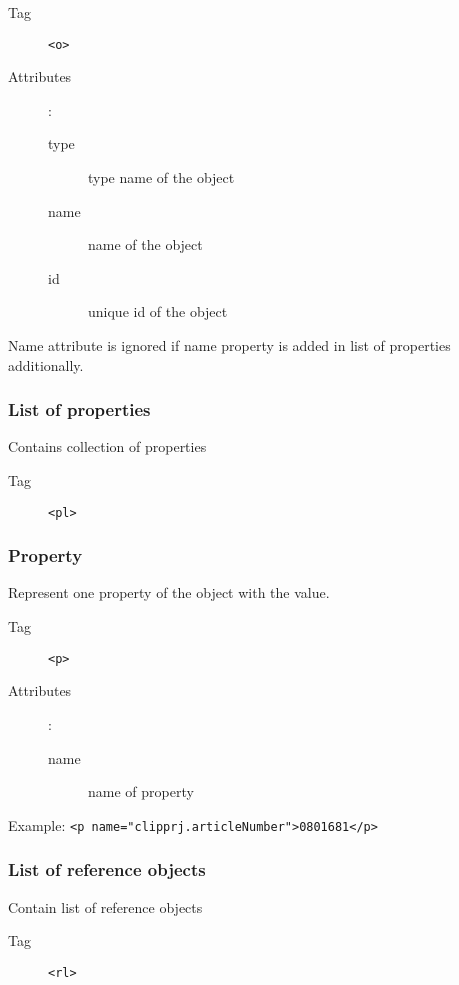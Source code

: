 \documentclass[%
	a4paper,
	oneside,
	listof=numbered,
	parskip=half,
	headsepline=true,
	footsepline=false,
	0.7headlines,
	]{scrbook}
\begin{document}
\begin{description}
	\item[Tag] \verb|<o>|
	\item[Attributes]:
	
	\begin{description}
		\item[type] type name of the object
		\item[name] name of the object
		\item[id] unique id of the object
	\end{description}
\end{description}

Name attribute is ignored if name property is added in list of properties additionally.

\subsubsection{List of properties}

Contains collection of properties

\begin{description}
	\item[Tag] \verb|<pl>|
\end{description}

\subsubsection{Property}

Represent one property of the object with the value.

\begin{description}
	\item[Tag] \verb|<p>|
	\item[Attributes]:
	
	\begin{description}
		\item[name] name of property
	\end{description}
\end{description}

Example: \verb|<p name="clipprj.articleNumber">0801681</p>|

\subsubsection{List of reference objects}

Contain list of reference objects

\begin{description}
	\item[Tag] \verb|<rl>|
\end{description}
\end{document}
